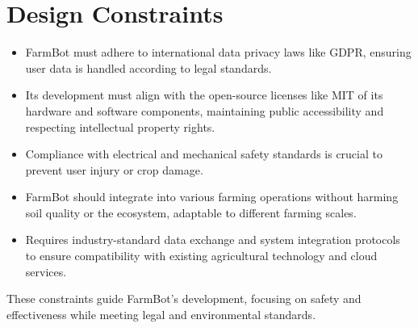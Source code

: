 \newpage

\section{Design Constraints}
\begin{itemize}
    \item FarmBot must adhere to international data privacy laws like GDPR, ensuring user data is handled according to legal standards.
    \item Its development must align with the open-source licenses like MIT of its hardware and software components, maintaining public accessibility and respecting intellectual property rights.
    \item Compliance with electrical and mechanical safety standards is crucial to prevent user injury or crop damage.
    \item FarmBot should integrate into various farming operations without harming soil quality or the ecosystem, adaptable to different farming scales.
    \item Requires industry-standard data exchange and system integration protocols to ensure compatibility with existing agricultural technology and cloud services.
\end{itemize}
These constraints guide FarmBot's development, focusing on safety and effectiveness while meeting legal and environmental standards.

